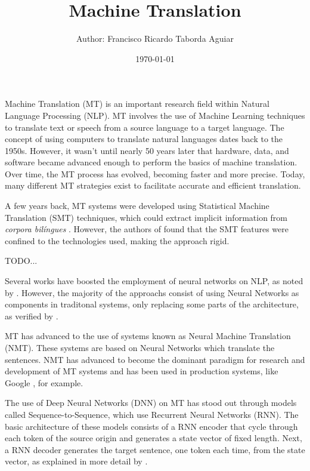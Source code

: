 \documentclass[a4paper]{article}
\title{
    Machine Translation\\
}
\author{
    \small{Author: Francisco Ricardo Taborda Aguiar}\\
}
\date{\today}
\begin{document}
    \maketitle

    Machine Translation (MT) is an important research field within 
    Natural Language Processing (NLP). MT involves the use of Machine 
    Learning techniques to translate text or speech from a source 
    language to a target language. The concept of using computers 
    to translate natural languages dates back to the 1950s. 
    However, it wasn't until nearly 50 years later that hardware, 
    data, and software became advanced enough to perform the basics 
    of machine translation. Over time, the MT process has evolved, 
    becoming faster and more precise. Today, many different MT 
    strategies exist to facilitate accurate and efficient translation.

    A few years back, MT systems were developed using Statistical Machine 
    Translation (SMT) techniques, which could extract implicit information 
    from \emph{corpora bil\'ingues} \cite{brown:1993}. However, the authors 
    of \cite{maruf:2021} found that the SMT features were confined to the 
    technologies used, making the approach rigid.

    TODO...

    Several works have boosted the employment of neural 
    networks on NLP, as noted by \cite{goldberg:2016}.
    However, the majority of the approachs consist of using Neural Networks
    as components in traditonal systems, only replacing some parts of the
    architecture, as verified by \cite{stahlberg:2020}.   

    MT has advanced to the use of systems known as 
    Neural Machine Translation (NMT). These systems are based on Neural 
    Networks which translate the sentences.
    NMT has advanced to become the dominant paradigm for research 
    and development of  MT systems \cite{tan:2020} and has been used 
    in production systems, like Google \cite{wu:2016}, for example.

    The use of Deep Neural Networks (DNN) on MT has stood out through 
    models called Sequence-to-Sequence, which use Recurrent Neural Networks
    (RNN). The basic architecture of these models consists of a RNN encoder
    that cycle through each token of the source origin and generates a 
    state vector of fixed length.
    Next, a RNN decoder generates the target sentence, one token each time,
    from the state vector, as explained in more detail by \cite{sutskever:2014}.
\end{document}
